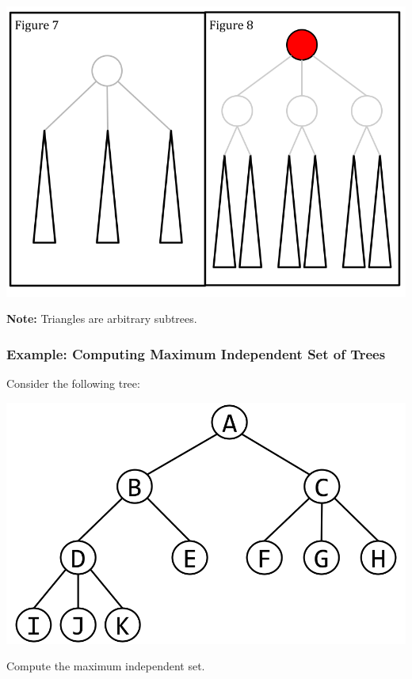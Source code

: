 \documentclass[letterpaper]{article}
\begin{document}
\begin{center}
    \includegraphics[scale=0.4]{../assets/indep_set_trees_2.png}

    \textbf{Note:} Triangles are arbitrary subtrees. 
\end{center}


\subsubsection{Example: Computing Maximum Independent Set of Trees}
Consider the following tree: 
\begin{center}
    \includegraphics[scale=0.3]{../assets/ind_set_ex_tree.png}
\end{center}
Compute the maximum independent set. 
\end{document}
